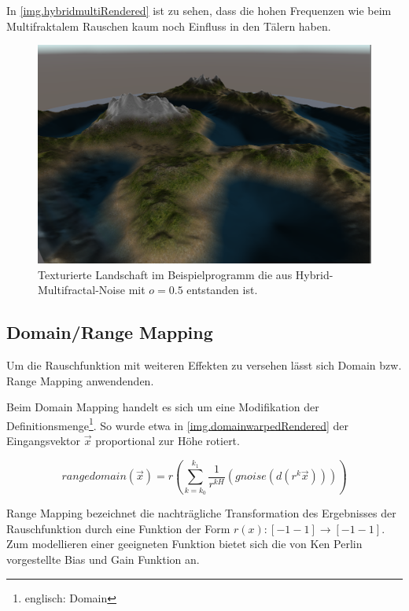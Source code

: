 In \autoref{img.hybridmultiRendered} ist zu sehen, dass die hohen Frequenzen wie beim Multifraktalem Rauschen kaum noch Einfluss in den Tälern haben.

\begin{figure}
	\centering
	\includegraphics[width=\textwidth]{images/hybridmulti_rendered.png}
	\caption{Texturierte Landschaft im Beispielprogramm die aus Hybrid-Multifractal-Noise mit $o=0.5$ entstanden ist.}\label{img.hybridmultiRendered}
\end{figure}




\subsection{Domain/Range Mapping} %
Um die Rauschfunktion mit weiteren Effekten zu versehen lässt sich Domain bzw. Range Mapping anwendenden. 

Beim Domain Mapping handelt es sich um eine Modifikation der Definitionsmenge\footnote{englisch: Domain}. So wurde etwa in \autoref{img.domainwarpedRendered} der Eingangsvektor $\vec{x}$ proportional zur Höhe rotiert.

\begin{equation} \label{eq.domainrangemapping}
rangedomain(\vec{x}) = r\left( \sum_{k=k_0}^{k_1}\frac{1}{r^{kH}}(gnoise(d(r^k\vec{x})))\right)
\end{equation}

Range Mapping bezeichnet die nachträgliche Transformation des Ergebnisses der Rauschfunktion durch eine Funktion der Form $r(x): [-1-1]\to[-1-1]$.
Zum modellieren einer geeigneten Funktion bietet sich die von Ken Perlin vorgestellte %
Bias und Gain Funktion an.


